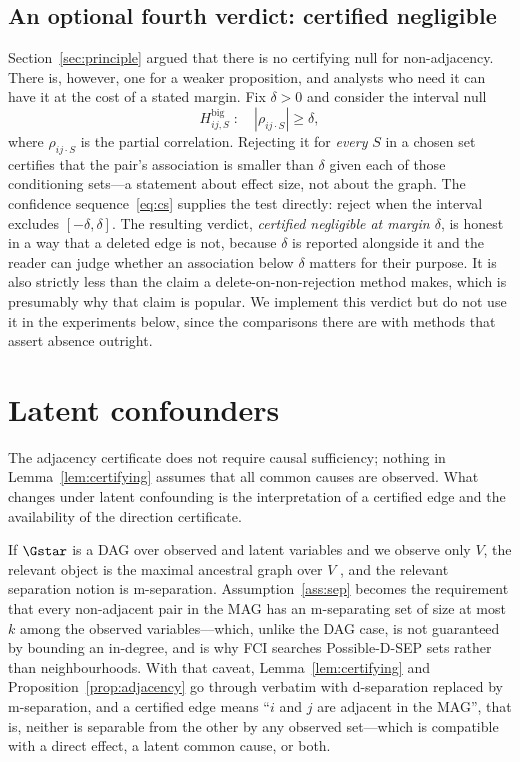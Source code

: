\subsection{An optional fourth verdict: certified negligible}
\label{sec:negligible}

Section~\ref{sec:principle} argued that there is no certifying null for
non-adjacency. There is, however, one for a weaker proposition, and analysts
who need it can have it at the cost of a stated margin. Fix $\delta > 0$ and
consider the interval null
\begin{equation}\label{eq:ropenull}
H^{\mathrm{big}}_{ij,S} \;:\quad |\rho_{ij \cdot S}| \ge \delta ,
\end{equation}
where $\rho_{ij\cdot S}$ is the partial correlation. Rejecting it for
\emph{every} $S$ in a chosen set certifies that the pair's association is
smaller than $\delta$ given each of those conditioning sets---a statement
about effect size, not about the graph. The confidence
sequence~\eqref{eq:cs} supplies the test directly: reject when the interval
excludes $[-\delta, \delta]$. The resulting verdict, \emph{certified
negligible at margin $\delta$}, is honest in a way that a deleted edge is not,
because $\delta$ is reported alongside it and the reader can judge whether an
association below $\delta$ matters for their purpose. It is also strictly less
than the claim a delete-on-non-rejection method makes, which is presumably why
that claim is popular. We implement this verdict but do not use it in the
experiments below, since the comparisons there are with methods that assert
absence outright.

\section{Latent confounders}\label{sec:latent}

The adjacency certificate does not require causal sufficiency; nothing in
Lemma~\ref{lem:certifying} assumes that all common causes are observed.
What changes under latent confounding is the interpretation of a certified
edge and the availability of the direction certificate.

If $\Gstar$ is a DAG over observed and latent variables and we observe only
$V$, the relevant object is the maximal ancestral graph over $V$
\citep{richardson2002ancestral}, and the relevant separation notion is
m-separation. Assumption~\ref{ass:sep} becomes the requirement that every
non-adjacent pair in the MAG has an m-separating set of size at most $k$ among
the observed variables---which, unlike the DAG case, is not guaranteed by
bounding an in-degree, and is why FCI searches Possible-D-SEP sets rather than
neighbourhoods. With that caveat, Lemma~\ref{lem:certifying} and
Proposition~\ref{prop:adjacency} go through verbatim with d-separation
replaced by m-separation, and a certified edge means ``$i$ and $j$ are
adjacent in the MAG'', that is, neither is separable from the other by any
observed set---which is compatible with a direct effect, a latent common
cause, or both.

